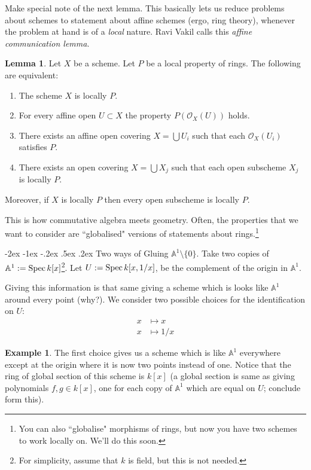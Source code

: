 \documentclass[11pt]{amsart}
\makeatletter
\renewcommand\subsection{\@startsection {subsection}{1}{\z@}%
	{-2ex \@plus -1ex \@minus -.2ex}%
	{.5ex \@plus.2ex}%
	{\normalfont\bfseries}}
\newcommand{\Spec}{{\rm Spec \,}}
\newcommand{\A}{{\mathbb A}}
\theoremstyle{definition}
\newtheorem{lemma}[theorem]{Lemma}
\newtheorem{example}[theorem]{Example}
\makeatother
\begin{document}
Make special note of the next lemma. This basically lets us reduce problems about schemes to statement about affine schemes (ergo, ring theory), whenever the problem at hand is of a \textit{local} nature. Ravi Vakil calls this \textit{affine communication lemma}.

\begin{lemma}
	\label{lemma-locally-P}
	Let $X$ be a scheme. Let $P$ be a local property of rings.
	The following are equivalent:
	\begin{enumerate}
		\item The scheme $X$ is locally $P$.
		\item For every affine open $U \subset X$ the property
		$P(\mathcal{O}_X(U))$ holds.
		\item There exists an affine open covering $X = \bigcup U_i$ such that
		each $\mathcal{O}_X(U_i)$ satisfies $P$.
		\item There exists an open covering $X = \bigcup X_j$
		such that each open subscheme $X_j$ is locally $P$.
	\end{enumerate}
	Moreover, if $X$ is locally $P$ then every open subscheme
	is locally $P$.
\end{lemma}

This is how commutative algebra meets geometry. Often, the properties that we want to consider are ``globalised" versions of statements about rings.\footnote{You can also ``globalise" morphisms of rings, but now you have two schemes to work locally on. We'll do this soon.}

\subsection{Two ways of Gluing \texorpdfstring{$\A^1\setminus \lbrace 0\rbrace$}{Pn}.}
\label{subsection-gluing-A1}
Take two copies of $\A^1:= \Spec k[x]$\footnote{For simplicity, assume that $k$ is field, but this is not needed.}. Let $U:= \Spec k[x,1/x]$, be the complement of the origin in $\A^1$.

\begin{center}
\end{center}

Giving this information is that same giving a scheme which is looks like $\A^1$ around every point (why?). We consider two possible choices for the identification on $U$:
\begin{align*}
x &\mapsto x\\
x &\mapsto 1/x
\end{align*}
\begin{example}\label{example-double-origin}
 The first choice gives us a scheme which is like $\A^1$ everywhere except at the origin where it is now two points instead of one. Notice that the ring of global section of this scheme is $k[x]$ (a global section is same as giving polynomials $f, g\in k[x]$, one for each copy of $\A^1$ which are equal on $U$; conclude form this).
\end{example}
\end{document}
